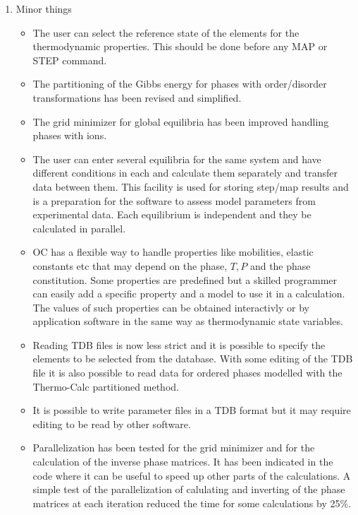 \documentclass[12pt]{article}
\begin{document}
\begin{enumerate}
\item Minor things
\begin{itemize}
\item The user can select the reference state of the elements for the
  thermodynamic properties.  This should be done before any MAP or
  STEP command.

\item The partitioning of the Gibbs energy for phases with
  order/disorder transformations has been revised and simplified.

\item The grid minimizer for global equilibria has been improved
  handling phases with ions.

\item The user can enter several equilibria for the same system and
  have different conditions in each and calculate them separately and
  transfer data between them.  This facility is used for storing
  step/map results and is a preparation for the software to assess
  model parameters from experimental data.  Each equilibrium is
  independent and they be calculated in parallel.

\item OC has a flexible way to handle properties like mobilities,
  elastic constants etc that may depend on the phase, $T, P$ and the
  phase constitution.  Some properties are predefined but a skilled
  programmer can easily add a specific property and a model to use it
  in a calculation.  The values of such properties can be obtained
  interactivly or by application software in the same way as
  thermodynamic state variables.

\item Reading TDB files is now less strict and it is possible to
  specify the elements to be selected from the database.  With some
  editing of the TDB file it is also possible to read data for ordered
  phases modelled with the Thermo-Calc partitioned method.

\item It is possible to write parameter files in a TDB format but it
  may require editing to be read by other software.

\item Parallelization has been tested for the grid minimizer and for
  the calculation of the inverse phase matrices.  It has been
  indicated in the code where it can be useful to speed up other parts
  of the calculations.  A simple test of the parallelization of
  calulating and inverting of the phase matrices at each iteration
  reduced the time for some calculations by 25\%.


\end{itemize}
\end{enumerate}
\end{document}
